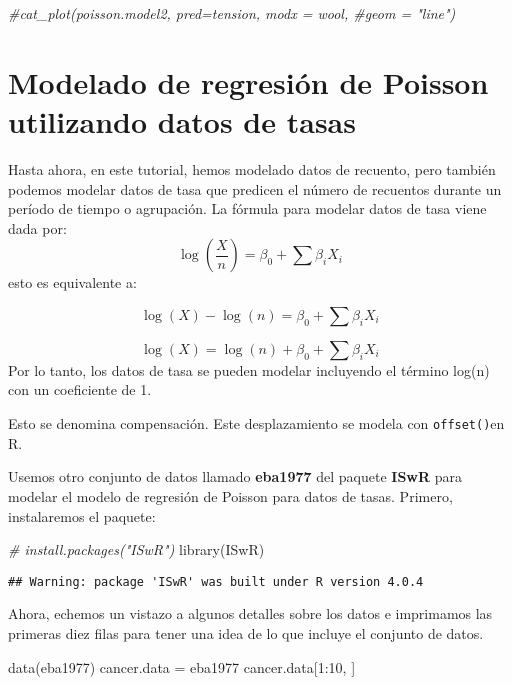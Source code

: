 \documentclass[
]{book}
\newenvironment{Shaded}{\begin{snugshade}}{\end{snugshade}}
\newcommand{\CommentTok}[1]{\textcolor[rgb]{0.56,0.35,0.01}{\textit{#1}}}
\newcommand{\DecValTok}[1]{\textcolor[rgb]{0.00,0.00,0.81}{#1}}
\newcommand{\FunctionTok}[1]{\textcolor[rgb]{0.00,0.00,0.00}{#1}}
\newcommand{\NormalTok}[1]{#1}
\newcommand{\OtherTok}[1]{\textcolor[rgb]{0.56,0.35,0.01}{#1}}
\newcommand{\SpecialCharTok}[1]{\textcolor[rgb]{0.00,0.00,0.00}{#1}}
\begin{document}
\begin{Shaded}
\begin{Highlighting}[]
\CommentTok{\#cat\_plot(poisson.model2, pred=tension, modx = wool, \#geom = "line")}
\end{Highlighting}
\end{Shaded}

\hypertarget{modelado-de-regresiuxf3n-de-poisson-utilizando-datos-de-tasas}{%
\chapter{Modelado de regresión de Poisson utilizando datos de tasas}\label{modelado-de-regresiuxf3n-de-poisson-utilizando-datos-de-tasas}}

Hasta ahora, en este tutorial, hemos modelado datos de recuento, pero también podemos modelar datos de tasa que predicen el número de recuentos durante un período de tiempo o agrupación. La fórmula para modelar datos de tasa viene dada por: \[\log (\frac{X}{n})=\beta_{0}+\sum \beta_i X_{i}\] esto es equivalente a:

\[\log (X)-\log (n)=\beta_{0}+\sum \beta_{i} X_{i}\]

\[\log (X)=\log (n)+\beta_{0}+\sum \beta_i X_{i}\] Por lo tanto, los datos de tasa se pueden modelar incluyendo el término log(n) con un coeficiente de 1.

Esto se denomina compensación. Este desplazamiento se modela con \texttt{offset()}en R.

Usemos otro conjunto de datos llamado \textbf{eba1977} del paquete \textbf{ISwR} para modelar el modelo de regresión de Poisson para datos de tasas. Primero, instalaremos el paquete:

\begin{Shaded}
\begin{Highlighting}[]
\CommentTok{\# install.packages("ISwR")}
\FunctionTok{library}\NormalTok{(ISwR)}
\end{Highlighting}
\end{Shaded}

\begin{verbatim}
## Warning: package 'ISwR' was built under R version 4.0.4
\end{verbatim}

Ahora, echemos un vistazo a algunos detalles sobre los datos e imprimamos las primeras diez filas para tener una idea de lo que incluye el conjunto de datos.

\begin{Shaded}
\begin{Highlighting}[]
\FunctionTok{data}\NormalTok{(eba1977)}
\NormalTok{cancer.data }\OtherTok{=}\NormalTok{ eba1977}
\NormalTok{cancer.data[}\DecValTok{1}\SpecialCharTok{:}\DecValTok{10}\NormalTok{, ]}
\end{Highlighting}
\end{Shaded}
\end{document}
